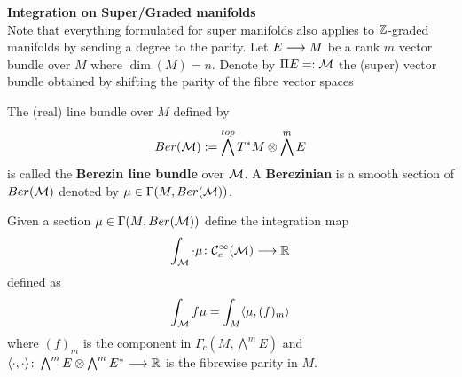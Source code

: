 \begin{rem}
  \textbf{Integration on Super/Graded manifolds}\\
  Note that everything formulated for super manifolds also applies to $\mathbb{Z}$-graded manifolds by sending a degree to the parity. Let $E \longrightarrow M$ be a rank $m$ vector bundle over $M$ where $\dim(M) = n$. Denote by $\Pi E=: \mathcal{M}$ the (super) vector bundle obtained by shifting the parity of the fibre vector spaces

  \begin{definition}
    The (real) line bundle over $M$ defined by
    $$ Ber(\mathcal{M}) := \bigwedge^{top} T^*M \otimes \bigwedge^m E $$
    is called the \textbf{Berezin line bundle} over $\mathcal{M}$. A \textbf{Berezinian} is a smooth section of $Ber(\mathcal{M})$ denoted by $\mu \in \Gamma(M, Ber(\mathcal{M}))$.
  \end{definition}

  \begin{definition}
    Given a section $\mu \in \Gamma(M, Ber(\mathcal{M}))$ define the integration map
    $$ \int_{\mathcal{M}} \cdot \mu \colon \mathcal{C}^{\infty}_c(\mathcal{M}) \longrightarrow \mathbb{R} $$
    defined as
    $$ \int_{\mathcal{M}} f \mu = \int_M \langle \mu, (f)_m \rangle $$
    where $(f)_m$ is the component in $\Gamma_c(M, \bigwedge^m E)$ and $\langle \cdot, \cdot \rangle \colon \bigwedge^m E \otimes \bigwedge^m E^* \longrightarrow \mathbb{R}$ is the fibrewise parity in $M$.
  \end{definition}


\end{rem}
